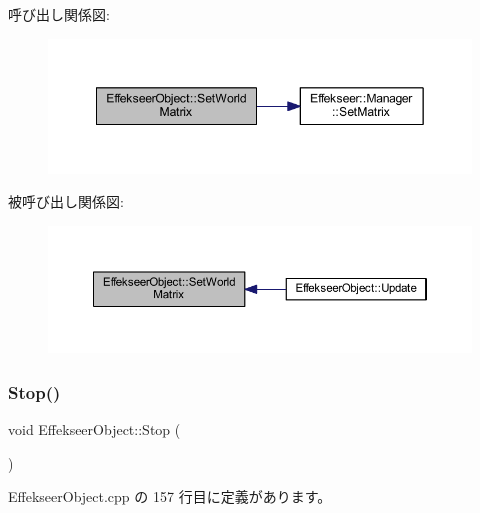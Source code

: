 呼び出し関係図\+:\nopagebreak
\begin{figure}[H]
\begin{center}
\leavevmode
\includegraphics[width=349pt]{class_effekseer_object_afde70f366e91d31a84ff9b280d4ae3c4_cgraph}
\end{center}
\end{figure}
被呼び出し関係図\+:\nopagebreak
\begin{figure}[H]
\begin{center}
\leavevmode
\includegraphics[width=350pt]{class_effekseer_object_afde70f366e91d31a84ff9b280d4ae3c4_icgraph}
\end{center}
\end{figure}
\mbox{\label{class_effekseer_object_adfbdfbe202b78441b33d76656453e536}} 
\subsubsection{\texorpdfstring{Stop()}{Stop()}}
{\footnotesize\ttfamily void Effekseer\+Object\+::\+Stop (\begin{DoxyParamCaption}{ }\end{DoxyParamCaption})}



 Effekseer\+Object.\+cpp の 157 行目に定義があります。

